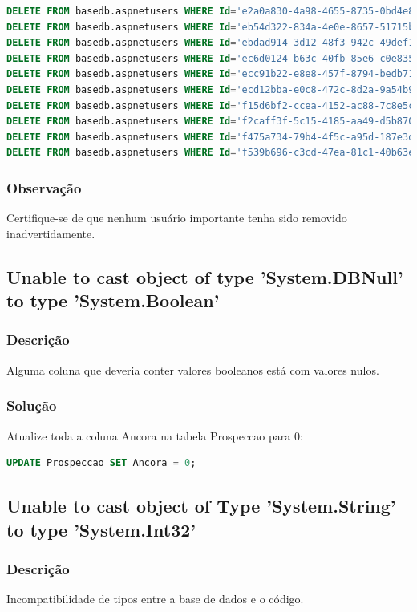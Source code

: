 \documentclass[12pt]{article}
\begin{document}
\begin{lstlisting}[language=SQL]
DELETE FROM basedb.aspnetusers WHERE Id='e2a0a830-4a98-4655-8735-0bd4e8264622';
DELETE FROM basedb.aspnetusers WHERE Id='eb54d322-834a-4e0e-8657-51715bd41ecb';
DELETE FROM basedb.aspnetusers WHERE Id='ebdad914-3d12-48f3-942c-49def121dcd7';
DELETE FROM basedb.aspnetusers WHERE Id='ec6d0124-b63c-40fb-85e6-c0e83518ac4e';
DELETE FROM basedb.aspnetusers WHERE Id='ecc91b22-e8e8-457f-8794-bedb713b5d01';
DELETE FROM basedb.aspnetusers WHERE Id='ecd12bba-e0c8-472c-8d2a-9a54b9a40873';
DELETE FROM basedb.aspnetusers WHERE Id='f15d6bf2-ccea-4152-ac88-7c8e5c191f1f';
DELETE FROM basedb.aspnetusers WHERE Id='f2caff3f-5c15-4185-aa49-d5b870b17b80';
DELETE FROM basedb.aspnetusers WHERE Id='f475a734-79b4-4f5c-a95d-187e3d4cb3e9';
DELETE FROM basedb.aspnetusers WHERE Id='f539b696-c3cd-47ea-81c1-40b63e6f7435';
\end{lstlisting}

\subsubsection{Observação}
Certifique-se de que nenhum usuário importante tenha sido removido inadvertidamente.

\subsection{Unable to cast object of type 'System.DBNull' to type 'System.Boolean'}
\subsubsection{Descrição}
Alguma coluna que deveria conter valores booleanos está com valores nulos.

\subsubsection{Solução}
Atualize toda a coluna Ancora na tabela Prospeccao para 0:
\begin{lstlisting}[language=SQL]
UPDATE Prospeccao SET Ancora = 0;
\end{lstlisting}

\subsection{Unable to cast object of Type 'System.String' to type 'System.Int32'}
\subsubsection{Descrição}
Incompatibilidade de tipos entre a base de dados e o código.
\end{document}

